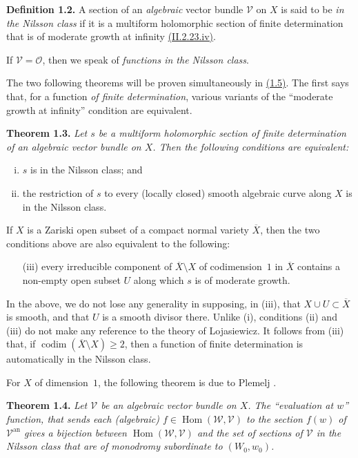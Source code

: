 \documentclass{report}
\newenvironment{itenv}[1]
  {\phantomsection\par\medskip\noindent\textbf{#1.}\itshape}
  {\par\medskip}
\newenvironment{rmenv}[1]
  {\phantomsection\par\medskip\noindent\textbf{#1.}\rmfamily}
  {\par\medskip}
\newcommand{\scr}[1]{{\mathscr{#1}}}
\renewcommand{\cal}[1]{{\mathcal{#1}}}
\newcommand{\an}{\mathrm{an}}
\renewcommand{\geq}{\geqslant}
\DeclareMathOperator{\Hom}{Hom}
\DeclareMathOperator{\codim}{codim}
\newcommand{\oldpage}[1]{\marginpar{\footnotesize$\Big\vert$ \textit{p.~#1}}}
\begin{document}
\begin{rmenv}{Definition 1.2}
\label{III.1.2}
  A section of an \emph{algebraic} vector bundle $\cal{V}$ on $X$ is said to be \emph{in the Nilsson class} if it is a multiform holomorphic section of finite determination that is of moderate growth at infinity \hyperref[II.2.23]{(II.2.23.iv)}.

  If $\cal{V}=\cal{O}$, then we speak of \emph{functions in the Nilsson class}.
\end{rmenv}

The two following theorems will be proven simultaneously in \hyperref[III.1.5proof]{(1.5)}.
The first says that, for a function \emph{of finite determination}, various variants of the ``moderate growth at infinity'' condition are equivalent.

\begin{itenv}{Theorem 1.3}
\label{III.1.3}
  Let $s$ be a multiform holomorphic section of finite determination of an algebraic vector bundle on $X$.
  Then the following conditions are equivalent:
  \begin{enumerate}[(i)]
    \item $s$ is in the Nilsson class; and
    \item the restriction of $s$ to every (locally closed) smooth algebraic curve along $X$ is in the Nilsson class.
  \end{enumerate}
\oldpage{123}
  If $X$ is a Zariski open subset of a compact normal variety $\overline{X}$, then the two conditions above are also equivalent to the following:
  \begin{enumerate}
    \item[{\rm(iii)}] every irreducible component of $\overline{X}\setminus X$ of codimension~$1$ in $\overline{X}$ contains a non-empty open subset $U$ along which $s$ is of moderate growth.
  \end{enumerate}
\end{itenv}

In the above, we do not lose any generality in supposing, in (iii), that $X\cup U\subset\overline{X}$ is smooth, and that $U$ is a smooth divisor there.
Unlike (i), conditions (ii) and (iii) do not make any reference to the theory of Lojasiewicz.
It follows from (iii) that, if $\codim(\overline{X}\setminus X)\geq2$, then a function of finite determination is automatically in the Nilsson class.

For $X$ of dimension~$1$, the following theorem is due to Plemelj \cite{23}.

\begin{itenv}{Theorem 1.4}
\label{III.1.4}
  Let $\cal{V}$ be an algebraic vector bundle on $X$.
  The ``evaluation at $w$'' function, that sends each (algebraic) $f\in\Hom(\scr{W},\cal{V})$ to the section $f(w)$ of $\cal{V}^\an$ gives a bijection between $\Hom(\scr{W},\cal{V})$ and the set of sections of $\cal{V}$ in the Nilsson class that are of monodromy subordinate to $(W_0,w_0)$.
\end{itenv}
\end{document}
